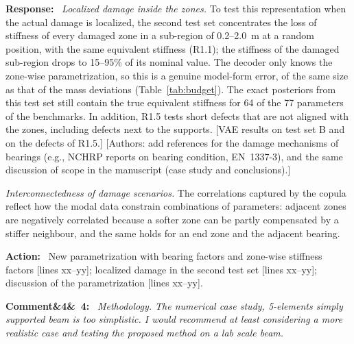 \documentclass[11pt]{article}
\newenvironment{rcomment}[1]{\par\bigskip\noindent\textbf{Comment\ifx&#1&\else\ #1\fi:}\ \itshape}{\par}
\newenvironment{response}{\par\smallskip\noindent\color{resp}\textbf{Response:}\ }{\par}
\newenvironment{action}{\par\smallskip\noindent\color{resp}\textbf{Action:}\ }{\par}
\newcommand{\authornote}[1]{\textcolor{note}{\textsf{[Authors: #1]}}}
\newcommand{\tbd}[1]{\textcolor{note}{\textsf{[#1]}}}
\newcommand{\lines}[1]{\tbd{lines #1}}
\begin{document}
\begin{response}
\textit{Localized damage inside the zones.} To test this representation when the actual damage is localized, the second
test set concentrates the loss of stiffness of every damaged zone in a sub-region of 0.2--2.0~m at a random position,
with the same equivalent stiffness (R1.1); the stiffness of the damaged sub-region drops to 15--95\% of its nominal value.
The decoder only knows the zone-wise parametrization, so this is a genuine model-form error, of the same size as that of
the mass deviations (Table~\ref{tab:budget}). The exact posteriors from this test set still contain the true equivalent
stiffness for 64 of the 77 parameters of the benchmarks. In addition, R1.5 tests short defects that are not aligned with
the zones, including defects next to the supports.
\tbd{VAE results on test set B and on the defects of R1.5.}
\authornote{add references for the damage mechanisms of bearings (e.g., NCHRP reports on bearing condition, EN~1337-3), and the same discussion of scope in the
manuscript (case study and conclusions).}

\textit{Interconnectedness of damage scenarios.} The correlations captured by the copula reflect how the modal data
constrain combinations of parameters: adjacent zones are negatively correlated because a softer zone can be partly
compensated by a stiffer neighbour, and the same holds for an end zone and the adjacent bearing.
\end{response}

\begin{action}
New parametrization with bearing factors and zone-wise stiffness factors \lines{xx--yy}; localized damage in the
second test set \lines{xx--yy}; discussion of the parametrization \lines{xx--yy}.
\end{action}

\begin{rcomment}{4}
Methodology. The numerical case study, 5-elements simply supported beam is too simplistic. I would recommend at least
considering a more realistic case and testing the proposed method on a lab scale beam.
\end{rcomment}
\end{document}
